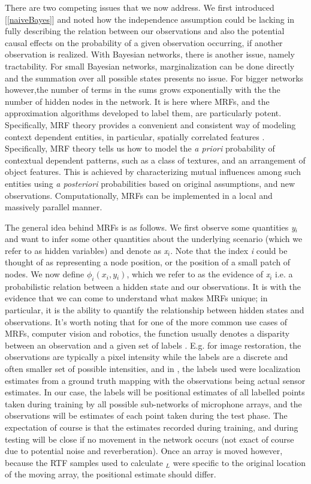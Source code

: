 \documentclass{article}
\begin{document}
There are two competing issues that we now address. We first introduced [\ref{naiveBayes}] and noted how the independence assumption could be lacking in fully describing the relation between our observations and also the potential causal effects on the probability of a given observation occurring, if another observation is realized. With Bayesian networks, there is another issue, namely tractability. For small Bayesian networks, marginalization can be done directly and the summation over all possible states presents no issue. For bigger networks however,the number of terms in the sums grows exponentially with the the number of hidden nodes in the network. It is here where MRFs, and the approximation algorithms developed to label them, are particularly potent. Specifically, MRF theory provides a convenient and consistent way of modeling context dependent entities, in particular, spatially correlated features \cite{LI_mrfModelingCompVis}. Specifically, MRF theory tells us how to model the \textit{a priori} probability of contextual dependent patterns, such as a class of textures, and an arrangement of object features. This is achieved by characterizing mutual influences among such entities using \textit{a posteriori} probabilities based on original assumptions, and new observations. Computationally, MRFs can be implemented in a local and massively parallel manner. 

The general idea behind MRFs is as follows. We first observe some quantities \textit{y}$_i$ and want to infer some other quantities about the underlying scenario (which we refer to as hidden variables) and denote as \textit{x}$_i$. Note that the index \textit{i} could be thought of as representing a node position, or the position of a small patch of nodes. We now define $\phi_i\left(\textit{x$_i$},\textit{y$_i$}\right)$, which we refer to as the evidence of \textit{x}$_i$ i.e. a probabilistic relation between a hidden state and our observations. It is with the evidence that we can come to understand what makes MRFs unique; in particular, it is the ability to quantify the relationship between hidden states and observations. It's worth noting that for one of the more common use cases of MRFs, computer vision and robotics, the function usually denotes a disparity between an observation and a given set of labels \cite{YB_fastApproxEnergyMinGraphCuts}. E.g. for image restoration, the observations are typically a pixel intensity while the labels are a discrete and often smaller set of possible intensities, and in \cite{NA_misalignmentRecMRFsFcn}, the labels used were localization estimates from a ground truth mapping with the observations being actual sensor estimates. In our case, the labels will be positional estimates of all labelled points taken during training by all possible sub-networks of microphone arrays, and the observations will be estimates of each point taken during the test phase. The expectation of course is that the estimates recorded during training, and during testing will be close if no movement in the network occurs (not exact of course due to potential noise and reverberation). Once an array is moved however, because the RTF samples used to calculate \textbf{\Gamma$_L$} were specific to the original location of the moving array, the positional estimate should differ.
\end{document}
